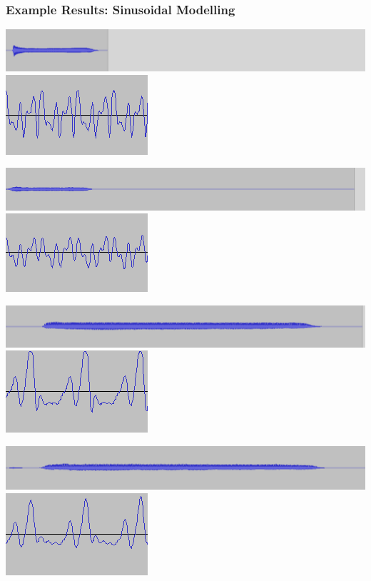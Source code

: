 \documentclass{beamer}
\begin{document}
\begin{frame}

\frametitle{Example Results: Sinusoidal Modelling}

\includegraphics[width=0.8\linewidth]{./OriginalSaxophone.png}
\includegraphics[width=0.17\linewidth]{./OriginalSaxophoneZoom.png}

\includegraphics[width=0.8\linewidth]{./ReconstructedSaxophone.png}
\includegraphics[width=0.17\linewidth]{./ReconstructedSaxophoneZoom.png}

\bigskip

\includegraphics[width=0.8\linewidth]{./OriginalTrumpet.png}
\includegraphics[width=0.17\linewidth]{./OriginalTrumpetZoom.png}

\includegraphics[width=0.8\linewidth]{./ReconstructedTrumpet.png}
\includegraphics[width=0.17\linewidth]{./ReconstructedTrumpetZoom.png}

\end{frame}
\end{document}
